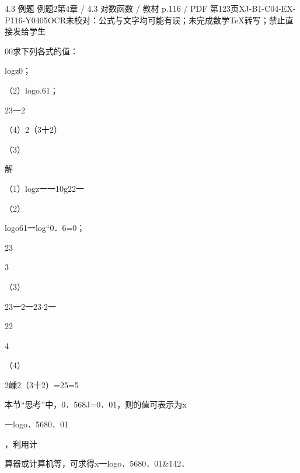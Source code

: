 \begin{bankitem}{4.3 例题 例题2}{第4章 / 4.3 对数函数 / 教材 p.116 / PDF 第123页}{XJ-B1-C04-EX-P116-Y0405}{OCR未校对：公式与文字均可能有误；未完成数学TeX转写；禁止直接发给学生}
\begin{ocrdraft}
\par
00求下列各式的值：
\par
logz0；
\par
（2）logo.61；
\par
23一2
\par
（4）2（3十2）
\par
（3）
\par
解
\par
（1）logz一一10g22一
\par
（2）
\par
logo61一log“0．6=0；
\par
23
\par
3
\par
（3）
\par
23一2一23\ensuremath{\cdot}2一
\par
22
\par
4
\par
（4）
\par
2嵊2（3十2）=25=5
\par
本节“思考”中，0．568J=0．01，则的值可表示为x
\par
一logo．5680．01
\par
，利用计
\par
算器或计算机等，可求得x一logo．5680．01\&142．
\end{ocrdraft}
\end{bankitem}
